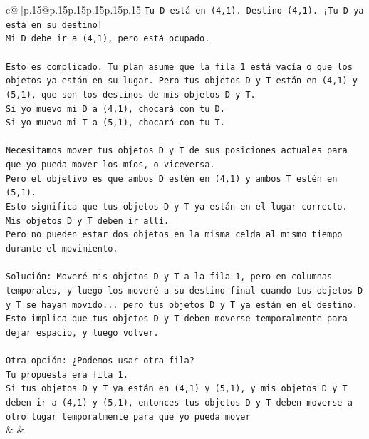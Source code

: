 \documentclass{article}
\begin{document}
{\begin{supertabular}{c@{$\;$}|p{.15\linewidth}@{}p{.15\linewidth}p{.15\linewidth}p{.15\linewidth}p{.15\linewidth}p{.15\linewidth}}
{{{\texttt{Tu D está en (4,1). Destino (4,1). ¡Tu D ya está en su destino!} \\
\texttt{Mi D debe ir a (4,1), pero está ocupado.} \\
\\ 
\texttt{Esto es complicado. Tu plan asume que la fila 1 está vacía o que los objetos ya están en su lugar. Pero tus objetos D y T están en (4,1) y (5,1), que son los destinos de mis objetos D y T.} \\
\texttt{Si yo muevo mi D a (4,1), chocará con tu D.} \\
\texttt{Si yo muevo mi T a (5,1), chocará con tu T.} \\
\\ 
\texttt{Necesitamos mover tus objetos D y T de sus posiciones actuales para que yo pueda mover los míos, o viceversa.} \\
\texttt{Pero el objetivo es que ambos D estén en (4,1) y ambos T estén en (5,1).} \\
\texttt{Esto significa que tus objetos D y T ya están en el lugar correcto. Mis objetos D y T deben ir allí.} \\
\texttt{Pero no pueden estar dos objetos en la misma celda al mismo tiempo durante el movimiento.} \\
\\ 
\texttt{Solución: Moveré mis objetos D y T a la fila 1, pero en columnas temporales, y luego los moveré a su destino final cuando tus objetos D y T se hayan movido... pero tus objetos D y T ya están en el destino.} \\
\texttt{Esto implica que tus objetos D y T deben moverse temporalmente para dejar espacio, y luego volver.} \\
\\ 
\texttt{Otra opción: ¿Podemos usar otra fila?} \\
\texttt{Tu propuesta era fila 1.} \\
\texttt{Si tus objetos D y T ya están en (4,1) y (5,1), y mis objetos D y T deben ir a (4,1) y (5,1), entonces tus objetos D y T deben moverse a otro lugar temporalmente para que yo pueda mover} \\
            }
        }
    }
    & & \\ \\


\end{supertabular}}
\end{document}
